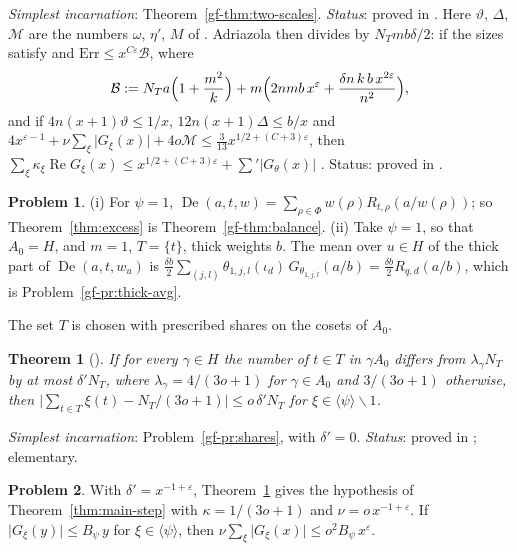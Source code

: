 \documentclass[reqno]{amsart}
\theoremstyle{definition}
\newtheorem{problem}{Problem}[section]
\theoremstyle{plain}
\newtheorem{theorem}{Theorem}[section]
\newcommand{\Bc}{\mathcal{B}}
\newcommand{\De}{\operatorname{De}}
\renewcommand{\Re}{\operatorname{Re}}
\begin{document}
\noindent\emph{Simplest incarnation}: Theorem~\ref{gf-thm:two-scales}.  \emph{Status}: proved in \cite{Adr}.  Here \(\vartheta\), \(\Delta\), \(\mathcal{M}\) are the numbers \(\omega\), \(\eta'\), \(M\) of \cite{Adr}.  Adriazola then divides by \(N_Tmb\delta/2\): if the sizes satisfy \cite[(4.6), (4.7)]{Adr} and \(\mathrm{Err} \le x^{C\varepsilon}\Bc\), where
\[
  \Bc := N_T a\Bigl(1 + \frac{m^2}{k}\Bigr) + m\Bigl(2nmb\,x^\varepsilon + \frac{\delta n\,k\,b\,x^{2\varepsilon}}{n^2}\Bigr) ,
\]
and if \(4n(x+1)\vartheta \le 1/x\), \(12n(x+1)\Delta \le b/x\) and \(4x^{\varepsilon-1} + \nu\sum_\xi\lvert G_\xi(x)\rvert + 4o\mathcal{M} \le \frac3{13}x^{1/2+(C+3)\varepsilon}\), then \(\sum_\xi\kappa_\xi\Re G_\xi(x) \le x^{1/2+(C+3)\varepsilon} + \sum'\lvert G_\theta(x)\rvert\) \cite[Prop.~4.3 and Cor.~4.4]{Adr}.  Status: proved in \cite{Adr}.

\begin{problem}\label{pr:excess-avg}
(i) For \(\psi = 1\), \(\De(a,t,w) = \sum_{\rho\in\Phi} w(\rho)R_{t,\rho}(a/w(\rho))\); so Theorem~\ref{thm:excess} is Theorem~\ref{gf-thm:balance}.
(ii) Take \(\psi = 1\), so that \(A_0 = H\), and \(m = 1\), \(T = \{t\}\), thick weights \(b\).  The mean over \(u \in H\) of the thick part of \(\De(a, t, w_u)\) is \(\frac{\delta b}{2}\sum_{(j,l)}\theta_{1,j,l}(\iota_d)\,G_{\theta_{1,j,l}}(a/b) = \frac{\delta b}{2} R_{q,d}(a/b)\), which is Problem~\ref{gf-pr:thick-avg}.
\end{problem}

The set \(T\) is chosen with prescribed shares on the cosets of \(A_0\).

\begin{theorem}[{\cite[Lemma~5.18]{Adr}}]\label{thm:shares}
If for every \(\gamma \in H\) the number of \(t \in T\) in \(\gamma A_0\) differs from \(\lambda_\gamma N_T\) by at most \(\delta' N_T\), where \(\lambda_\gamma = 4/(3o+1)\) for \(\gamma \in A_0\) and \(3/(3o+1)\) otherwise, then \(\lvert\sum_{t\in T}\xi(t) - N_T/(3o+1)\rvert \le o\,\delta' N_T\) for \(\xi \in \langle\psi\rangle \smallsetminus 1\).
\end{theorem}

\noindent\emph{Simplest incarnation}: Problem~\ref{gf-pr:shares}, with \(\delta' = 0\).  \emph{Status}: proved in \cite{Adr}; elementary.

\begin{problem}\label{pr:shares-nu}
With \(\delta' = x^{-1+\varepsilon}\), Theorem~\ref{thm:shares} gives the hypothesis of Theorem~\ref{thm:main-step} with \(\kappa = 1/(3o+1)\) and \(\nu = o\,x^{-1+\varepsilon}\).  If \(\lvert G_\xi(y)\rvert \le B_\psi\, y\) for \(\xi \in \langle\psi\rangle\), then \(\nu\sum_\xi\lvert G_\xi(x)\rvert \le o^2B_\psi\,x^\varepsilon\).
\end{problem}
\end{document}
